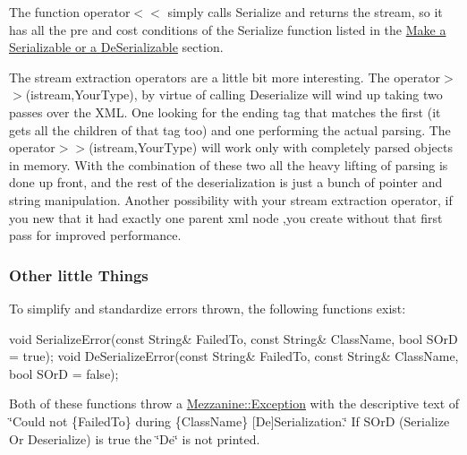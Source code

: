  The function operator$<$$<$ simply calls Serialize and returns the stream, so it has all the pre and cost conditions of the Serialize function listed in the \hyperlink{Serialization_serializationmaking}{Make a Serializable or a DeSerializable} section. \par
 \par
 The stream extraction operators are a little bit more interesting. The operator$>$$>$(istream,YourType), by virtue of calling Deserialize will wind up taking two passes over the XML. One looking for the ending tag that matches the first (it gets all the children of that tag too) and one performing the actual parsing. The operator$>$$>$(istream,YourType) will work only with completely parsed objects in memory. With the combination of these two all the heavy lifting of parsing is done up front, and the rest of the deserialization is just a bunch of pointer and string manipulation. Another possibility with your stream extraction operator, if you new that it had exactly one parent xml node ,you create without that first pass for improved performance. \hypertarget{Serialization_serializationmisc}{}\subsubsection{Other little Things}\label{Serialization_serializationmisc}
To simplify and standardize errors thrown, the following functions exist: 
\begin{DoxyCode}
 void SerializeError(const String& FailedTo, const String& ClassName, bool SOrD =
       true);
 void DeSerializeError(const String& FailedTo, const String& ClassName, bool SOrD
       = false);
\end{DoxyCode}
 Both of these functions throw a \hyperlink{classMezzanine_1_1Exception}{Mezzanine::Exception} with the descriptive text of \char`\"{}Could not \{FailedTo\} during \{ClassName\} \mbox{[}De\mbox{]}Serialization.\char`\"{} If SOrD (Serialize Or Deserialize) is true the \char`\"{}De\char`\"{} is not printed. 